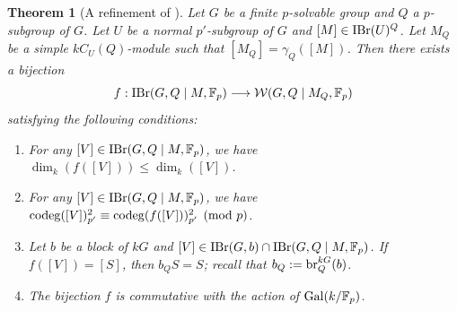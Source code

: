 \documentclass[preprint,12pt,3p]{elsarticle}
\newtheorem{theorem}{Theorem}[section]
\def\IBr{{\rm IBr}}
\def\br{{\rm br}}
\def\Gal{{\rm Gal}}
\def\W{\mathcal{W}}
\def\F{\mathbb{F}}
\begin{document}
\begin{theorem}[A refinement of {\cite[Theorem 7.1]{Turull14}}]\label{theo:psolvable-relative}
Let $G$ be a finite $p$-solvable group
and $Q$ a $p$-subgroup of $G$.
Let $U$ be a normal $p'$-subgroup of $G$
and $[M] \in \IBr(U)^Q$.
Let $M_Q$ be a simple $kC_U(Q)$-module
such that $[M_Q] = \gamma_Q([M])$.
Then there exists a bijection
\[
f:\IBr(G,Q\mid M,\F_p)
\longrightarrow
\W(G,Q\mid M_Q,\F_p)
\]
satisfying the following conditions:
\begin{enumerate}[{\rm (i)}]
\item For any $[V]\in\IBr(G,Q\mid M,\F_p)$,
we have
$\dim_k(f([V]))\leq\dim_k([V])$.

\item For any $[V]\in\IBr(G,Q\mid M,\F_p)$,
we have ${\rm codeg}([V])_{p'}^2 \equiv {\rm codeg}(f([V]))_{p'}^2 \pmod{p}$.

\item Let $b$ be a block of $kG$ and
$[V]\in\IBr(G,b)\cap\IBr(G,Q\mid M,\F_p)$.
If $f([V])=[S]$, then
$b _Q S = S$; recall that $b_Q := \br_Q^{kG}(b)$.

\item The bijection $f$ is commutative with the action of
$\Gal(k/\F_p)$.
\end{enumerate}
\end{theorem}
\end{document}
